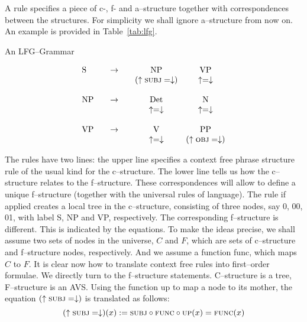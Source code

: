 A rule specifies a piece of c-, f- and a--structure together with
correspondences between the structures.
For simplicity we shall ignore a--structure from now on. An
example is provided in Table~\ref{tab:lfg}.
\begin{table}
\caption{An LFG--Grammar}
\label{tab:lfg}
$$\begin{array}{lccc}
\mbox{\rm S} & \quad\pf\quad & \mbox{\rm NP} & \mbox{\rm VP} \\
             &               & (\uparrow \mbox{\sc subj} =
             \downarrow) & \uparrow = \downarrow \\
             \\
\mbox{\rm NP} & \quad \pf \quad & \mbox{\rm Det} & \mbox{\rm N} \\
              &   & \uparrow = \downarrow & \uparrow = \downarrow
              \\
              \\
\mbox{\rm VP} & \quad\pf\quad & \mbox{\rm V} & \mbox{\rm PP} \\
              &               & \uparrow = \downarrow &
                (\uparrow \mbox{\sc obj} = \downarrow)
\end{array}$$
\end{table}
The rules have two lines: the upper line specifies a context free
phrase structure rule of the usual kind for the c--structure. The 
lower line tells us how the c--structure relates to the f--structure. 
These correspondences will allow to define a unique f--structure
(together with the universal rules of language). The rule if
applied creates a local tree in the c--structure, consisting of
three nodes, say 0, 00, 01, with label {\rm S}, {\rm NP} and {\rm
VP}, respectively. The corresponding f--structure is different.
This is indicated by the equations. To make the ideas precise, we
shall assume two sets of nodes in the universe, $C$ and $F$, which
are sets of c--structure and f--structure nodes, respectively. And we
assume a function {\sc func}, which maps $C$ to $F$. It is clear
now how to translate context free rules into first--order
formulae. We directly turn to the f--structure statements.
C--structure is a tree, F--structure is an AVS. Using the function
{\sc up} to map a node to its mother, the equation $(\uparrow
\mbox{\sc subj} = \downarrow)$ is translated as follows:
\begin{equation}
(\uparrow \mbox{\sc subj} = \downarrow)(x) :=
\mbox{\sc subj} \circ \mbox{\sc func} \circ \mbox{\sc up}(x)
\doteq \mbox{\sc func}(x)
\end{equation}
